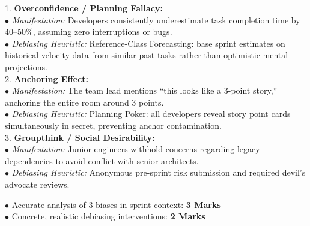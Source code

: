 \begin{solutionbox}
1. \textbf{Overconfidence / Planning Fallacy:}\\
$\bullet$ \textit{Manifestation:} Developers consistently underestimate task completion time by 40--50\%, assuming zero interruptions or bugs.\\
$\bullet$ \textit{Debiasing Heuristic:} Reference-Class Forecasting: base sprint estimates on historical velocity data from similar past tasks rather than optimistic mental projections.\\
2. \textbf{Anchoring Effect:}\\
$\bullet$ \textit{Manifestation:} The team lead mentions ``this looks like a 3-point story,'' anchoring the entire room around 3 points.\\
$\bullet$ \textit{Debiasing Heuristic:} Planning Poker: all developers reveal story point cards simultaneously in secret, preventing anchor contamination.\\
3. \textbf{Groupthink / Social Desirability:}\\
$\bullet$ \textit{Manifestation:} Junior engineers withhold concerns regarding legacy dependencies to avoid conflict with senior architects.\\
$\bullet$ \textit{Debiasing Heuristic:} Anonymous pre-sprint risk submission and required devil's advocate reviews.
\begin{markingrubric}
$\bullet$ Accurate analysis of 3 biases in sprint context: \textbf{3 Marks}\\
$\bullet$ Concrete, realistic debiasing interventions: \textbf{2 Marks}
\end{markingrubric}
\end{solutionbox}

